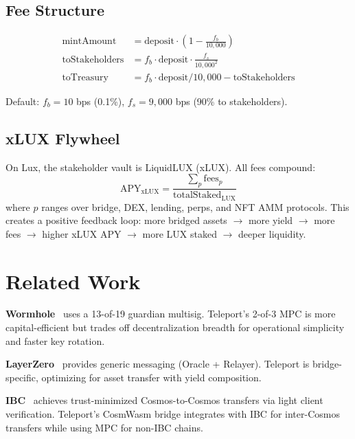 \documentclass[11pt]{article}
\begin{document}
\subsection{Fee Structure}

\begin{align}
  \text{mintAmount} &= \text{deposit} \cdot \left(1 - \frac{f_b}{10{,}000}\right) \\
  \text{toStakeholders} &= f_b \cdot \text{deposit} \cdot \frac{f_s}{10{,}000^2} \\
  \text{toTreasury} &= f_b \cdot \text{deposit} / 10{,}000 - \text{toStakeholders}
\end{align}

Default: $f_b = 10$ bps (0.1\%), $f_s = 9{,}000$ bps (90\% to stakeholders).

\subsection{xLUX Flywheel}

On Lux, the stakeholder vault is LiquidLUX (xLUX). All fees compound:
\begin{equation}
  \text{APY}_{\text{xLUX}} = \frac{\sum_p \text{fees}_p}{\text{totalStaked}_{\text{LUX}}}
\end{equation}
where $p$ ranges over bridge, DEX, lending, perps, and NFT AMM protocols. This creates a positive feedback loop: more bridged assets $\to$ more yield $\to$ more fees $\to$ higher xLUX APY $\to$ more LUX staked $\to$ deeper liquidity.

\section{Related Work}
\label{sec:related}

\textbf{Wormhole}~\cite{wormhole} uses a 13-of-19 guardian multisig. Teleport's 2-of-3 MPC is more capital-efficient but trades off decentralization breadth for operational simplicity and faster key rotation.

\textbf{LayerZero}~\cite{layerzero} provides generic messaging (Oracle + Relayer). Teleport is bridge-specific, optimizing for asset transfer with yield composition.

\textbf{IBC}~\cite{ibc} achieves trust-minimized Cosmos-to-Cosmos transfers via light client verification. Teleport's CosmWasm bridge integrates with IBC for inter-Cosmos transfers while using MPC for non-IBC chains.
\end{document}
